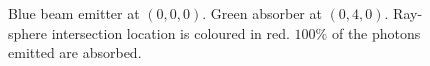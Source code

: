 \documentclass[12pt]{article}
\begin{document}
\begin{figure} 
\centering
{}
  \caption{
Blue beam emitter at $(0, 0, 0)$. 
Green absorber at $(0, 4, 0)$. 
Ray-sphere intersection location is coloured in red.
$100\%$ of the photons emitted are absorbed.
}
\end{figure}
\end{document}
